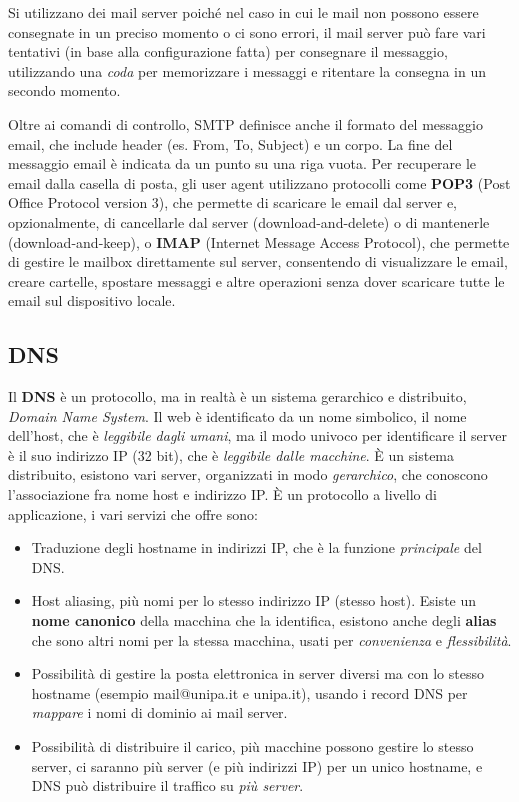 Si utilizzano dei mail server poiché nel caso in cui le mail non possono essere consegnate in un preciso momento o ci sono errori, il mail server può fare vari tentativi (in base alla configurazione fatta) per consegnare il messaggio, utilizzando una \textit{coda} per memorizzare i messaggi e ritentare la consegna in un secondo momento.

Oltre ai comandi di controllo, SMTP definisce anche il formato del messaggio email, che include header (es. From, To, Subject) e un corpo. La fine del messaggio email è indicata da un punto su una riga vuota. Per recuperare le email dalla casella di posta, gli user agent utilizzano protocolli come \textbf{POP3} (Post Office Protocol version 3), che permette di scaricare le email dal server e, opzionalmente, di cancellarle dal server (download-and-delete) o di mantenerle (download-and-keep), o \textbf{IMAP} (Internet Message Access Protocol), che permette di gestire le mailbox direttamente sul server, consentendo di visualizzare le email, creare cartelle, spostare messaggi e altre operazioni senza dover scaricare tutte le email sul dispositivo locale.

\subsection{DNS}
Il \textbf{DNS} è un protocollo, ma in realtà è un sistema gerarchico e distribuito, \textit{Domain Name System}.
Il web è identificato da un nome simbolico, il nome dell'host, che è \textit{leggibile dagli umani}, ma il modo univoco per identificare il server è il suo indirizzo IP (32 bit), che è \textit{leggibile dalle macchine}.
È un sistema distribuito, esistono vari server, organizzati in modo \textit{gerarchico}, che conoscono l'associazione fra nome host e indirizzo IP.
È un protocollo a livello di applicazione, i vari servizi che offre sono:
\begin{itemize}
  \item Traduzione degli hostname in indirizzi IP, che è la funzione \textit{principale} del DNS.
  \item Host aliasing, più nomi per lo stesso indirizzo IP (stesso host). Esiste un \textbf{nome canonico} della macchina che la identifica, esistono anche degli \textbf{alias} che sono altri nomi per la stessa macchina, usati per \textit{convenienza} e \textit{flessibilità}.
  \item Possibilità di gestire la posta elettronica in server diversi ma con lo stesso hostname (esempio mail@unipa.it e unipa.it), usando i record DNS per \textit{mappare} i nomi di dominio ai mail server.
  \item Possibilità di distribuire il carico, più macchine possono gestire lo stesso server, ci saranno più server (e più indirizzi IP) per un unico hostname, e DNS può distribuire il traffico su \textit{più server}.
\end{itemize}

